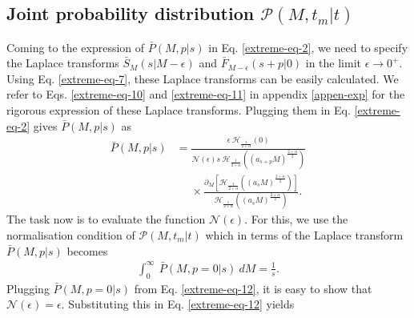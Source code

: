 \documentclass[showpacs,amsmath,amssymb,aps,pre,twocolumn,]{revtex4-1}
\def\greenw#1{{\color{black} #1}}
\begin{document}
\subsection{Joint probability distribution $\mathcal{P}(M, t_m|t)$}
Coming to the expression of $\bar{P}(M, p|s)$ in Eq. \eqref{extreme-eq-2}, we need to specify the Laplace transforms $\bar{S}_M(s|M-\epsilon)$ and $\bar{F}_{M-\epsilon}(s+p|0)$ in the limit $\epsilon \to 0^+$. Using Eq. \eqref{extreme-eq-7}, these Laplace transforms can be easily calculated. \greenw{We refer to Eqs. \eqref{extreme-eq-10} and \eqref{extreme-eq-11} in appendix  \ref{appen-exp} for the rigorous expression of these Laplace transforms.}
Plugging them in Eq. \eqref{extreme-eq-2} gives $\bar{P}(M, p|s)$ as
\begin{align}
\bar{P}(M, p|s)&= \frac{ \epsilon ~ \mathcal{H}_{\frac{1}{2+\alpha}} \left(0 \right) }{\mathcal{N} (\epsilon)s~\mathcal{H}_{\frac{1}{2+\alpha}} \left( (a_{s+p} M)^{\frac{2+\alpha}{2}} \right)}
\nonumber  \\
& ~~~~~~\times \frac{\partial _M \left[ \mathcal{H}_{\frac{1}{2+\alpha}} \left( (a_s M)^{\frac{2+\alpha}{2}} \right) \right]}{ \mathcal{H}_{\frac{1}{2+\alpha}} \left( (a_s M)^{\frac{2+\alpha}{2}} \right) } . \label{extreme-eq-12}
\end{align}
The task now is to evaluate the function $\mathcal{N}(\epsilon)$. For this, we use the normalisation condition of $\mathcal{P}(M,t_m|t)$ which in terms of the Laplace transform $\bar{P}(M, p|s)$ becomes
\begin{align}
\int _ 0^{\infty}~ \bar{P}(M, p=0|s)~dM = \frac{1}{s}. \label{extreme-eq-13}
\end{align}
Plugging $\bar{P}(M, p=0|s)$ from Eq. \eqref{extreme-eq-12}, it is easy to show that $\mathcal{N}(\epsilon)=\epsilon$. Substituting this in Eq. \eqref{extreme-eq-12} yields
\end{document}
